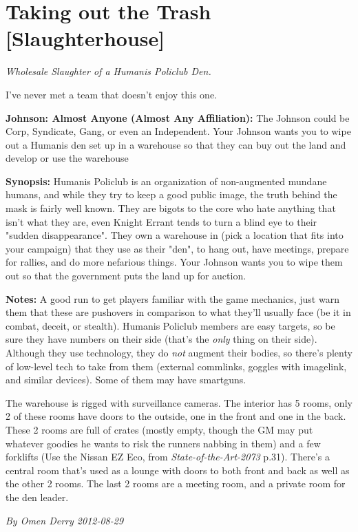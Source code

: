 \documentclass[letterpaper,twocolumn,10.5pt]{article}
\newenvironment{scenario}[6]
	{
		\section{#1 {\small[#2]}}
		\textit{#3}
		\def\TMPSCENARIO{#4 #5}
	}
	{\small\textit{By \TMPSCENARIO}}
\newcommand{\johnson}[2]{\textbf{Johnson: #1 (#2):}}
\newcommand{\synopsis}{\textbf{Synopsis: }}
\newcommand{\notes}{\textbf{Notes: }}
\begin{document}
\begin{scenario}{Taking out the Trash}
	{Slaughterhouse}
	{ Wholesale Slaughter of a Humanis Policlub Den.}
	{Omen Derry}
	{2012-08-29}
	{https://forum.rpg.net/showthread.php?321504-Shadowrun-4th-101-Instant-Scenarios\&p=15839327#post15839327}

I've never met a team that doesn't enjoy this one.

\johnson{Almost Anyone}{Almost Any Affiliation} The Johnson could be Corp, Syndicate, Gang, or even an Independent. Your Johnson wants you to wipe out a Humanis den set up in a warehouse so that they can buy out the land and develop or use the warehouse

\synopsis Humanis Policlub is an organization of non-augmented mundane humans, and while they try to keep a good public image, the truth behind the mask is fairly well known. They are bigots to the core who hate anything that isn't what they are, even Knight Errant tends to turn a blind eye to their "sudden disappearance". They own a warehouse in (pick a location that fits into your campaign) that they use as their "den", to hang out, have meetings, prepare for rallies, and do more nefarious things. Your Johnson wants you to wipe them out so that the government puts the land up for auction.

\notes A good run to get players familiar with the game mechanics, just warn them that these are pushovers in comparison to what they'll usually face (be it in combat, deceit, or stealth). Humanis Policlub members are easy targets, so be sure they have numbers on their side (that's the \textit{only} thing on their side). Although they use technology, they do \textit{not} augment their bodies, so there's plenty of low-level tech to take from them (external commlinks, goggles with imagelink, and similar devices). Some of them may have smartguns.

The warehouse is rigged with surveillance cameras. The interior has 5 rooms, only 2 of these rooms have doors to the outside, one in the front and one in the back. These 2 rooms are full of crates (mostly empty, though the GM may put whatever goodies he wants to risk the runners nabbing in them) and a few forklifts (Use the Nissan EZ Eco, from \textit{State-of-the-Art-2073} p.31). There's a central room that's used as a lounge with doors to both front and back as well as the other 2 rooms. The last 2 rooms are a meeting room, and a private room for the den leader.


\end{scenario}
\end{document}
